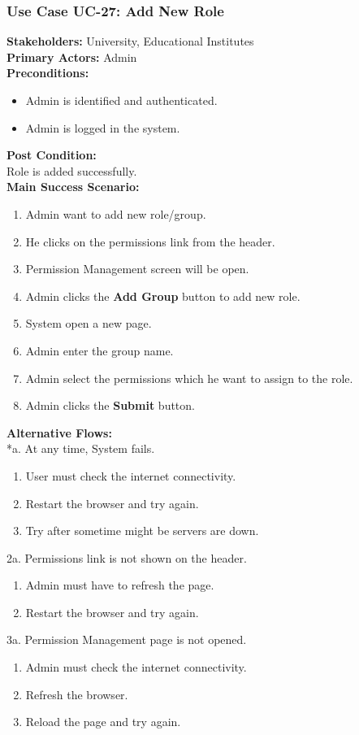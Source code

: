 \documentclass[12pt]{article}
\begin{document}
\subsubsection{Use Case UC-27: Add New Role}
\textbf{Stakeholders: } University, Educational Institutes \\
\textbf{Primary Actors: } Admin \\
\textbf{Preconditions:}
\begin{itemize}
\item Admin is identified and authenticated.
\item Admin is logged in the system.
\end{itemize}
\textbf{Post Condition: }\\
Role is added successfully.\\
\textbf{Main Success Scenario:}
\begin{enumerate}
\item Admin want to add new role/group.
\item He clicks on the permissions link from the header.
\item Permission Management screen will be open.
\item Admin clicks the \textbf{Add Group} button to add new role.
\item System open a new page.
\item Admin enter the group name.
\item Admin select the permissions which he want to assign to the role.
\item Admin clicks the \textbf{Submit} button. 
\end{enumerate}
\textbf{Alternative Flows:}\\
*a. At any time, System fails.
\begin{enumerate}
\item User must check the internet connectivity.
\item Restart the browser and try again.
\item Try after sometime might be servers are down.
\end{enumerate}
\newpage
2a. Permissions link is not shown on the header.
\begin{enumerate}
\item Admin must have to refresh the page.
\item Restart the browser and try again.
\end{enumerate} 
3a. Permission Management page is not opened.
\begin{enumerate}
\item Admin must check the internet connectivity.
\item Refresh the browser.
\item Reload the page and try again.
\end{enumerate}
\end{document}
